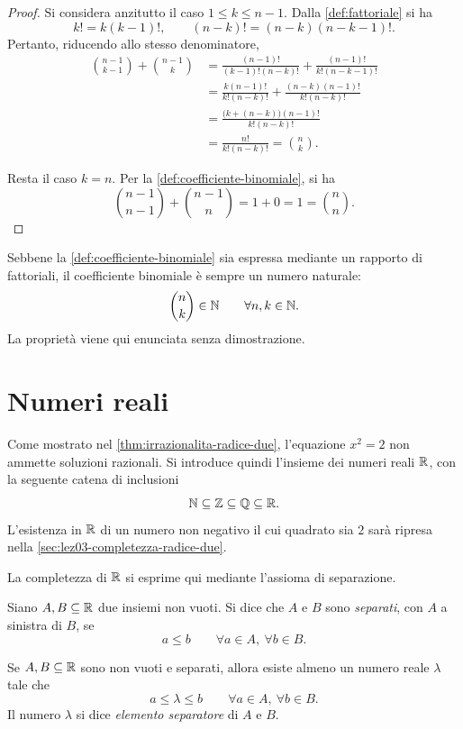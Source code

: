 \begin{proof}
Si considera anzitutto il caso \(1\le k\le n-1\).
Dalla \cref{def:fattoriale} si ha
\[
  k!=k(k-1)!,
  \qquad
  (n-k)!=(n-k)(n-k-1)!.
\]
Pertanto, riducendo allo stesso denominatore,
\begin{align*}
  \binom{n-1}{k-1}+\binom{n-1}{k}
    &=\frac{(n-1)!}{(k-1)!(n-k)!}
      +\frac{(n-1)!}{k!(n-k-1)!}\\
    &=\frac{k(n-1)!}{k!(n-k)!}
      +\frac{(n-k)(n-1)!}{k!(n-k)!}\\
    &=\frac{\bigl(k+(n-k)\bigr)(n-1)!}{k!(n-k)!}\\
    &=\frac{n!}{k!(n-k)!}
     =\binom{n}{k}.
\end{align*}

Resta il caso \(k=n\). Per la
\cref{def:coefficiente-binomiale}, si ha
\[
  \binom{n-1}{n-1}+\binom{n-1}{n}
  =1+0
  =1
  =\binom{n}{n}.
\]
\end{proof}

Sebbene la \cref{def:coefficiente-binomiale} sia espressa mediante
un rapporto di fattoriali, il coefficiente binomiale è sempre un
numero naturale:
\[
  \binom{n}{k}\in\mathbb{N}
  \qquad\forall n,k\in\mathbb{N}.
\]
La proprietà viene qui enunciata senza dimostrazione.

\section{Numeri reali}
\label{sec:lez03-numeri-reali}

Come mostrato nel \cref{thm:irrazionalita-radice-due},
l'equazione \(x^2=2\) non ammette soluzioni razionali.
Si introduce quindi l'insieme dei numeri reali \(\mathbb{R}\),
con la seguente catena di inclusioni
\[
  \mathbb{N}\subseteq\mathbb{Z}\subseteq\mathbb{Q}\subseteq\mathbb{R}.
\]
L'esistenza in \(\mathbb{R}\) di un numero non negativo il cui quadrato
sia \(2\) sarà ripresa nella
\cref{sec:lez03-completezza-radice-due}.

La completezza di \(\mathbb{R}\) si esprime qui mediante
l'assioma di separazione.

Siano \(A,B\subseteq\mathbb{R}\) due insiemi non vuoti.
Si dice che \(A\) e \(B\) sono \emph{separati},
con \(A\) a sinistra di \(B\), se
\[
  a\le b
  \qquad\forall a\in A,\ \forall b\in B.
\]

\begin{axiom}[Separazione]
\label{ass:assioma-separazione}
Se \(A,B\subseteq\mathbb{R}\) sono non vuoti e separati, allora esiste
almeno un numero reale \(\lambda\) tale che
\[
  a\le\lambda\le b
  \qquad\forall a\in A,\ \forall b\in B.
\]
Il numero \(\lambda\) si dice \emph{elemento separatore}
di \(A\) e \(B\).
\end{axiom}

